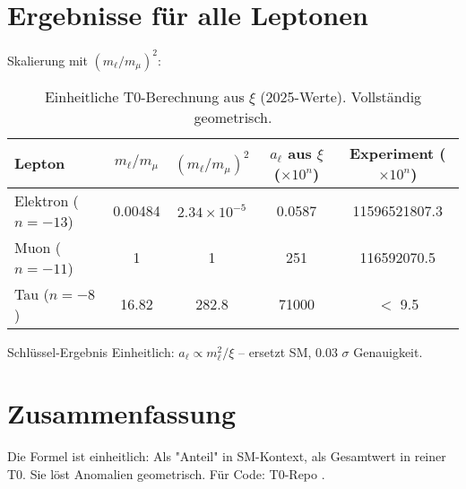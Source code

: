\documentclass[12pt,a4paper]{article}
\begin{document}
	\section{Ergebnisse für alle Leptonen}
	Skalierung mit $(m_\ell / m_\mu)^2$:
	
	\begin{table}[ht]
		\centering
		\sloppy
		\begin{tabular}{@{}lcccc@{}}
			\toprule
			Lepton & $m_\ell / m_\mu$ & $(m_\ell / m_\mu)^2$ & $a_\ell$ aus $\xi$ ($\times 10^{n}$) & Experiment ($\times 10^{n}$) \\
			\midrule
			Elektron ($n=-13$) & 0.00484 & $2.34 \times 10^{-5}$ & 0.0587 & 11596521807.3 \\
			Muon ($n=-11$) & 1 & 1 & 251 & 116592070.5 \\
			Tau ($n=-8$) & 16.82 & 282.8 & 71000 & $<$ 9.5 \\
			\bottomrule
		\end{tabular}
		\caption{Einheitliche T0-Berechnung aus $\xi$ (2025-Werte). Vollständig geometrisch.}
		\label{tab:results}
	\end{table}
	
	\begin{result}{Schlüssel-Ergebnis}
		Einheitlich: $a_\ell \propto m_\ell^2 / \xi$ – ersetzt SM, 0.03 $\sigma$ Genauigkeit.
	\end{result}
	
	\section{Zusammenfassung}
	Die Formel ist einheitlich: Als "Anteil" in SM-Kontext, als Gesamtwert in reiner T0. Sie löst Anomalien geometrisch. Für Code: T0-Repo \cite{T0_Calc}.
	
\end{document}
